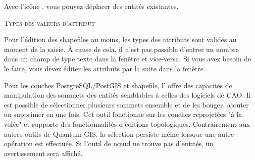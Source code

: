 Avec l'icône , vous pouvez déplacer des entités existantes.

\begin{Tip}[ht]\caption{\textsc{Types des valeurs d'attribut}}
Pour l'édition des shapefiles au moins, les types des attributs sont validés au moment de la saisie. À cause de cela, il n'est pas possible d'entrer un nombre dans un champ de type texte dans la fenêtre  et vice-versa. Si vous avez besoin de le faire, vous devez éditer les attributs par la suite dans la fenêtre .
\end{Tip}



Pour les couches PostgreSQL/PostGIS et shapefile, l' offre des capacités de manipulation des sommets des entités semblables à celles des logiciels de CAO. Il est possible de sélectionner plusieurs sommets ensemble et de les bouger, ajouter ou supprimer en une fois. Cet outil fonctionne sur les couches reprojetées "à la volée" et supporte des fonctionnalités d'éditions topologiques. Contrairement aux autres outils de Quantum GIS, la sélection persiste même lorsque une autre opération est effectuée. Si l'outil de nœud ne trouve pas d'entités, un avertissement sera affiché.

